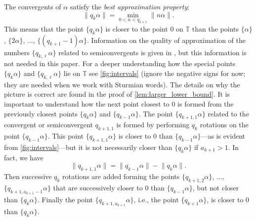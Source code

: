 \documentclass[a4paper,fleqn]{article}
\providecommand{\norm}[1]{\lVert#1\rVert}
\newcommand{\T}{\mathbb{T}}
\begin{document}
  The convergents of $\alpha$ satisfy the \emph{best approximation property}:
  \begin{equation*}
    \norm{q_k \alpha} = \min_{0 < n < q_{k+1}} \norm{n\alpha}.
  \end{equation*}
  This means that the point $\{q_k\alpha\}$ is closer to the point $0$ on $\T$ than the points $\{\alpha\}$,
  $\{2\alpha\}$, $\ldots$, $\{(q_{k+1} - 1)\alpha\}$. Information on the quality of approximation of the numbers
  $\{q_{k,\ell}\alpha\}$ related to semiconvergents is given in
  \cite[Prop.~2.2]{2015:characterization_of_repetitions_in_sturmian_words_a_new}, but this information is not needed in
  this paper. For a deeper understanding how the special points $\{q_k\alpha\}$ and $\{q_{k,\ell}\alpha\}$ lie on $\T$
  see \autoref{fig:intervals} (ignore the negative signs for now; they are needed when we work with Sturmian words).
  The details on why the picture is correct are found in the proof of \autoref{lem:larger_lower_bound}. It is important
  to understand how the next point closest to $0$ is formed from the previously closest points $\{q_k\alpha\}$ and
  $\{q_{k-1}\alpha\}$. The point $\{q_{k+1,1}\alpha\}$ related to the convergent or semiconvergent $q_{k+1,1}$ is
  formed by performing $q_k$ rotations on the point $\{q_{k-1}\alpha\}$. This point $\{q_{k+1,1}\alpha\}$ is closer to
  $0$ than $\{q_{k-1}\alpha\}$---as is evident from \autoref{fig:intervals}---but it is not necessarily closer than
  $\{q_k\alpha\}$ if $a_{k+1} > 1$. In fact, we have
  \begin{equation*}
    \norm{q_{k+1,1}\alpha} = \norm{q_{k-1}\alpha} - \norm{q_k\alpha}.
  \end{equation*}
  Then successive $q_k$ rotations are added forming the points $\{q_{k+1,2}\alpha\}$, $\ldots$,
  $\{q_{k+1,a_{k+1}-1}\alpha\}$ that are successively closer to $0$ than $\{q_{k-1}\alpha\}$, but not closer than
  $\{q_k\alpha\}$. Finally the point $\{q_{k+1,a_{k+1}}\alpha\}$, i.e., the point $\{q_{k+1}\alpha\}$, is closer to $0$
  than $\{q_k\alpha\}$.
\end{document}
